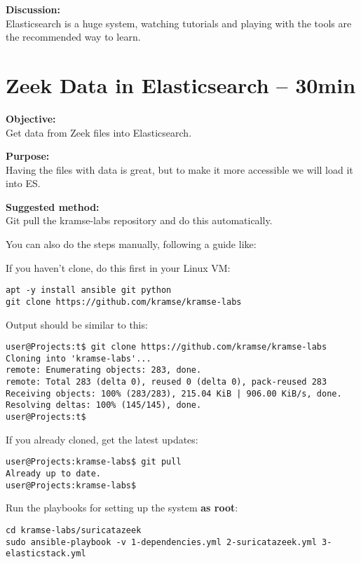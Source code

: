 \documentclass[a4paper,11pt,notitlepage]{report}
\begin{document}
{\bf Discussion:}\\
Elasticsearch is a huge system, watching tutorials and playing with the tools are the recommended way to learn.



\chapter{Zeek Data in Elasticsearch -- 30min}
\label{ex:zeek-json-es}

{\bf Objective:}\\
Get data from Zeek files into Elasticsearch.


{\bf Purpose:}\\
Having the files with data is great, but to make it more accessible we will load it into ES.


{\bf Suggested method:}\\
Git pull the kramse-labs repository and do this automatically.

You can also do the steps manually, following a guide like:\\


If you haven't clone, do this first in your Linux VM:
\begin{verbatim}
apt -y install ansible git python
git clone https://github.com/kramse/kramse-labs
\end{verbatim}

Output should be similar to this:
\begin{verbatim}
user@Projects:t$ git clone https://github.com/kramse/kramse-labs
Cloning into 'kramse-labs'...
remote: Enumerating objects: 283, done.
remote: Total 283 (delta 0), reused 0 (delta 0), pack-reused 283
Receiving objects: 100% (283/283), 215.04 KiB | 906.00 KiB/s, done.
Resolving deltas: 100% (145/145), done.
user@Projects:t$
\end{verbatim}

If you already cloned, get the latest updates:
\begin{verbatim}
user@Projects:kramse-labs$ git pull
Already up to date.
user@Projects:kramse-labs$
\end{verbatim}

Run the playbooks for setting up the system {\bf as root}:
\begin{verbatim}
cd kramse-labs/suricatazeek
sudo ansible-playbook -v 1-dependencies.yml 2-suricatazeek.yml 3-elasticstack.yml
\end{verbatim}
\end{document}
